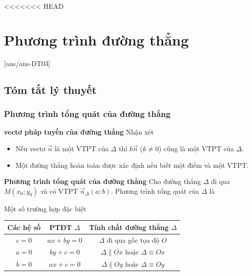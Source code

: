 <<<<<<< HEAD
\setcounter{section}{2}
\setcounter{dang}{0}
\section{Phương trình đường thẳng}
[ans/ans-DT03]
\subsection{Tóm tắt lý thuyết}

\subsubsection{Phương trình tổng quát của đường thẳng}

\textbf{vectơ pháp tuyến của đường thẳng}
	Nhận xét
	\begin{itemize}
		\item Nếu vectơ $\overrightarrow{n}$  là một VTPT của $\Delta$ thì $k \overrightarrow{n}$ ($k \ne 0 $) cũng là một VTPT của $\Delta$. 
		\item Một đường thẳng hoàn toàn được xác định nếu biết một điểm và một VTPT.
	\end{itemize}

\textbf{Phương trình tổng quát của đường thẳng}
	Cho đường thẳng $\Delta$ đi qua $M(x_0;y_0)$ và có VTPT $\overrightarrow{n}_{\Delta} (a;b)$. Phương trình tổng quát của $\Delta$ là 

 Một số trường hợp đặc biệt
	\begin{center}
		\renewcommand{\arraystretch}{2}%
		\begin{tabular}{|c|c|c|}
			\hline 
			Các hệ số & PTĐT $\Delta$ & Tính chất đường thẳng $\Delta$ \\ 
			\hline 
			$c=0$ & $ax+by =0$ & $\Delta$ đi qua gốc tọa độ $O$ \\ 
			\hline 
			$a=0$ & $by+c=0$ & $\Delta \parallel Ox$ hoặc $\Delta  \equiv Ox$ \\ 
			\hline 
			$b=0$ & $ax+c=0$ &  $\Delta \parallel Oy$ hoặc $\Delta  \equiv Oy$ \\ 
			\hline 
		\end{tabular} 
	\end{center}


